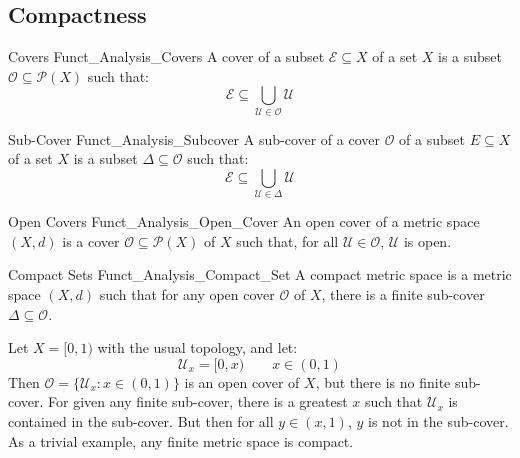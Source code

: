         \subsection{Compactness}
            \begin{ldefinition}{Covers}
                  {Funct_Analysis_Covers}
                A cover of a subset $\mathcal{E}\subseteq{X}$ of
                a set $X$ is a subset
                $\mathcal{O}\subseteq\mathcal{P}(X)$ such that:
                \begin{equation}
                    \mathcal{E}\subseteq
                    \bigcup_{\mathcal{U}\in\mathcal{O}}
                        \mathcal{U}
                \end{equation}
            \end{ldefinition}
            \begin{ldefinition}{Sub-Cover}
                  {Funct_Analysis_Subcover}
                A sub-cover of a cover $\mathcal{O}$ of a subset
                $E\subseteq{X}$ of a set $X$ is a subset
                $\Delta\subseteq\mathcal{O}$ such that:
              \begin{equation}
                    \mathcal{E}\subseteq
                    \bigcup_{\mathcal{U}\in\Delta}
                        \mathcal{U}
                \end{equation}
            \end{ldefinition}
            \begin{ldefinition}{Open Covers}
                  {Funct_Analysis_Open_Cover}
                An open cover of a metric space $(X,d)$ is a cover
                $\mathcal{O}\subseteq\mathcal{P}(X)$ of $X$ such
                that, for all $\mathcal{U}\in\mathcal{O}$,
                $\mathcal{U}$ is open.
            \end{ldefinition}
            \begin{ldefinition}{Compact Sets}
                  {Funct_Analysis_Compact_Set}
                A compact metric space is a metric space $(X,d)$
                such that for any open cover $\mathcal{O}$ of
                $X$, there is a finite
                sub-cover $\Delta\subseteq\mathcal{O}$.
            \end{ldefinition}
            \begin{lexample}
                Let $X=[0,1)$ with the usual topology, and let:
                \begin{equation}
                    \mathcal{U}_{x}=[0,x)
                    \quad\quad
                    x\in(0,1)
                \end{equation}
                Then $\mathcal{O}=\{\mathcal{U}_{x}:x\in(0,1)\}$
                is an open cover of $X$, but there is no finite
                sub-cover. For given any finite sub-cover,
                there is a greatest $x$ such that
                $\mathcal{U}_{x}$ is contained in the sub-cover.
                But then for all $y\in(x,1)$, $y$ is not in
                the sub-cover. As a trivial example, any
                finite metric space is compact.
            \end{lexample}
